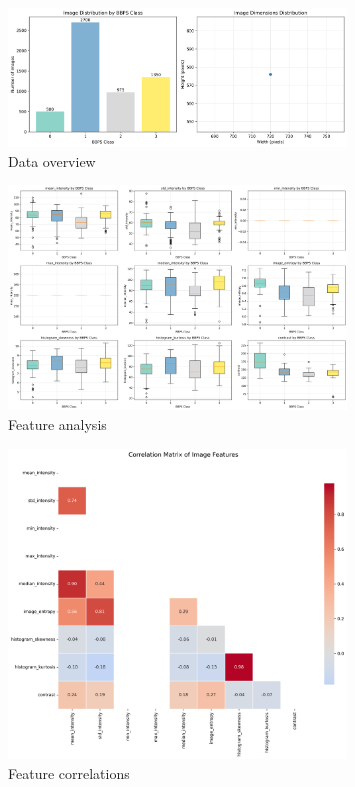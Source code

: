 \documentclass[11pt]{article}
\begin{document}
\begin{figure}[H]
\centering
\includegraphics[width=0.8\textwidth]{images/dataset_overview}
\caption{Data overview}
\label{fig:dataset_overview}
\end{figure}

\begin{figure}[H]
\centering
\includegraphics[width=0.8\textwidth]{images/feature_analysis}
\caption{Feature analysis}
\label{fig:feature_analysis}
\end{figure}

\begin{figure}[H]
\centering
\includegraphics[width=0.8\textwidth]{images/feature_correlations}
\caption{Feature correlations}
\label{fig:feature_correlations}
\end{figure}
\end{document}
